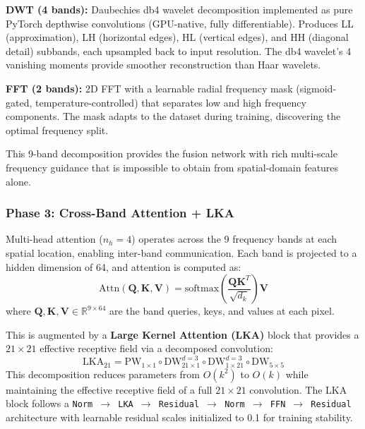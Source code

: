 \documentclass[10pt,twocolumn,letterpaper]{article}
\begin{document}
\noindent\textbf{DWT (4 bands):} Daubechies db4 wavelet decomposition implemented as pure PyTorch depthwise convolutions (GPU-native, fully differentiable). Produces LL (approximation), LH (horizontal edges), HL (vertical edges), and HH (diagonal detail) subbands, each upsampled back to input resolution. The db4 wavelet's 4 vanishing moments provide smoother reconstruction than Haar wavelets.

\noindent\textbf{FFT (2 bands):} 2D FFT with a learnable radial frequency mask (sigmoid-gated, temperature-controlled) that separates low and high frequency components. The mask adapts to the dataset during training, discovering the optimal frequency split.

This 9-band decomposition provides the fusion network with rich multi-scale frequency guidance that is impossible to obtain from spatial-domain features alone.

\subsubsection{Phase 3: Cross-Band Attention + LKA}

Multi-head attention ($n_h=4$) operates across the 9 frequency bands at each spatial location, enabling inter-band communication. Each band is projected to a hidden dimension of 64, and attention is computed as:
\begin{equation}
\text{Attn}(\mathbf{Q}, \mathbf{K}, \mathbf{V}) = \text{softmax}\!\left(\frac{\mathbf{Q}\mathbf{K}^T}{\sqrt{d_k}}\right)\mathbf{V}
\end{equation}
where $\mathbf{Q}, \mathbf{K}, \mathbf{V} \in \mathbb{R}^{9 \times 64}$ are the band queries, keys, and values at each pixel.

This is augmented by a \textbf{Large Kernel Attention (LKA)} block \cite{van} that provides a $21\times 21$ effective receptive field via a decomposed convolution:
\begin{equation}
\text{LKA}_{21} = \text{PW}_{1\times 1} \circ \text{DW}_{21\times 1}^{d=3} \circ \text{DW}_{1\times 21}^{d=3} \circ \text{DW}_{5\times 5}
\end{equation}
This decomposition reduces parameters from $O(k^2)$ to $O(k)$ while maintaining the effective receptive field of a full $21 \times 21$ convolution. The LKA block follows a \texttt{Norm $\to$ LKA $\to$ Residual $\to$ Norm $\to$ FFN $\to$ Residual} architecture with learnable residual scales initialized to 0.1 for training stability.
\end{document}
